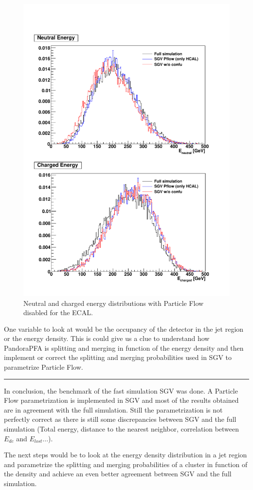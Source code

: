 \begin{figure}[htbp!]
  \centering
  \includegraphics[width=1\linewidth]{../Thesis_Plots/SGV/Plots/Total_EneuEcha_notjet_onlyHCAL.pdf}
  \caption{Neutral and charged energy distributions with Particle Flow disabled for the ECAL.}
  \label{fig:energy_ECALnoPFA}
\end{figure}

One variable to look at would be the occupancy of the detector in the jet region or the energy density. This is could give us a clue to understand how PandoraPFA is splitting and merging in function of the energy density and then implement or correct the splitting and merging probabilities used in SGV to parametrize Particle Flow.

\begin{center}
\rule{0.5\textwidth}{.4pt}
\end{center}

In conclusion, the benchmark of the fast simulation SGV was done. A Particle Flow parametrization is implemented in SGV and most of the results obtained are in agreement with the full simulation. Still the parametrization is not perfectly correct as there is still some discrepancies between SGV and the full simulation (Total energy, distance to the nearest neighbor, correlation between $E_{dc}$ and $E_{lost}$...).

The next steps would be to look at the energy density distribution in a jet region and parametrize the splitting and merging probabilities of a cluster in function of the density and achieve an even better agreement between SGV and the full simulation.
